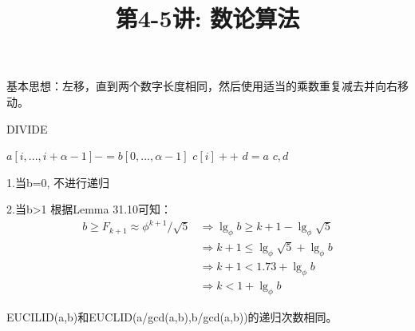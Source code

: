 \documentclass[a4paper, justified]{tufte-handout}
\title{第4-5讲: 数论算法}
\date{\zhtoday} %
\begin{document}
\maketitle
\noplagiarism %
\begin{abstract}
\end{abstract}
\beginrequired

\begin{problem}[TC 31.1-12]

\end{problem}

\begin{solution}
	基本思想：左移，直到两个数字长度相同，然后使用适当的乘数重复减去并向右移动。

	\begin{algorithm}[H]
		\caption{DIVIDE}
		\begin{algorithmic}[1]
			 
			\State $a[i,...,i + \alpha -1] -= b[0,...,\alpha - 1]$
			\State $c[i]++$
			\EndWhile
			\EndFor
			\State $d=a$
			\State \Return $c,d$
			\EndFunction
		\end{algorithmic}
	\end{algorithm}

\end{solution}

\begin{problem}[TC 31.2-5]
\end{problem}

\begin{solution}
	1.当b=0, 不进行递归

	2.当b>1
	根据Lemma 31.10可知：
	$$
		\begin{aligned}
			b \geq F_{k+1} \approx \phi^{k+1} / \sqrt{5} & \Rightarrow \lg _\phi b \geq k+1-\lg _\phi \sqrt{5} \\
			                                             & \Rightarrow k+1 \leq \lg _\phi \sqrt{5}+\lg _\phi b \\
			                                             & \Rightarrow k+1<1.73+\lg _\phi b                    \\
			                                             & \Rightarrow k<1+\lg _\phi b
		\end{aligned}
	$$

	EUCILID(a,b)和EUCLID(a/gcd(a,b),b/gcd(a,b))的递归次数相同。
\end{solution}
\end{document}
